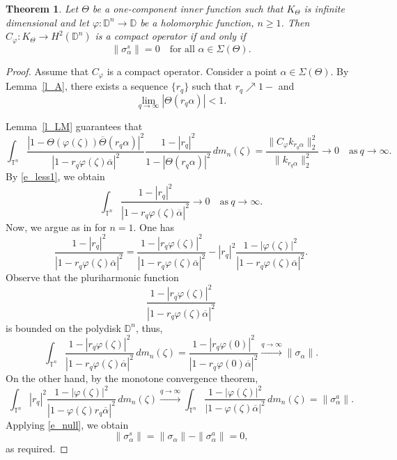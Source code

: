 \documentclass{amsart}
\numberwithin{equation}{section}
\newtheorem{theorem}{Theorem}[section]
\theoremstyle{definition}
\newcommand{\al}{\alpha}
\newcommand{\clk}{\sigma}
\newcommand{\meal}{m_n}
\newcommand{\diin}{\Theta}
\newcommand{\za}{\zeta}
\newcommand{\ph}{\varphi}
\newcommand{\cph}{C_\varphi}
\newcommand{\Dbb}{\mathbb D}
\newcommand{\tn}{\mathbb{T}^n}
\newcommand{\dn}{\mathbb{D}^n}
\newcommand{\knl}{k}
\newcommand{\spr}{\Sigma}
\begin{document}
\begin{theorem}\label{T_2}
Let $\diin$ be a one-component inner function such that $K_\diin$ is infinite dimensional
and let $\ph: \dn\to \Dbb$ be a holomorphic function, $n\ge 1$.
Then $\cph: K_\diin \to H^2(\dn)$ is a compact operator if and only if
\begin{equation}\label{e_clark}
\|\clk_\al^s\| =0 \quad \textrm{for all $\al\in\spr(\diin)$}.
\end{equation}
\end{theorem}
\begin{proof}
Assume that $\cph$ is a compact operator.
Consider a point $\al\in\spr(\diin)$.
By Lemma~\ref{l_A}, there exists a sequence $\{r_q\}$ such that $r_q\nearrow 1-$ and
\begin{equation}\label{e_less1}
  \lim_{q\to \infty} |\diin(r_q\al)| <1.
\end{equation}

Lemma~\ref{l_LM} guarantees that
\[
\int_{\tn}\frac{|1-\diin(\ph(\za))\overline{\diin}(r_q\al)|^2}{|1- r_q\ph(\za)\overline{\al}|^2} \frac{1-|r_q|^2}{1-|\diin(r_q\al)|^2}\,d\meal(\za)
= \frac{\|\cph \knl_{r_q\al}\|^2_{2}}{\|\knl_{r_q\al}\|^2_2} \to 0\quad \textrm{as}\ q\to\infty.
\]
By \eqref{e_less1}, we obtain
\begin{equation}\label{e_null}
  \int_{\tn}\frac{1-|r_q|^2}{|1- r_q\ph(\za)\overline{\al}|^2}
\to 0\quad \textrm{as}\ q\to\infty.
\end{equation}
Now, we argue as in \cite{CM97} for $n=1$.
One has
\[
\frac{1-|r_q|^2}{|1- r_q\ph(\za)\overline{\al}|^2}
= \frac{1-|r_q \ph(\za)|^2}{|1- r_q\ph(\za)\overline{\al}|^2}
-  |r_q|^2 \frac{1-|\ph(\za)|^2}{|1- r_q\ph(\za)\overline{\al}|^2}.
\]
Observe that the pluriharmonic function
\[
\frac{1-|r_q \ph(\za)|^2}{|1- r_q\ph(\za)\overline{\al}|^2}
\]
is bounded on the polydisk $\dn$,
thus,
\[
\int_{\tn}\frac{1-|r_q \ph(\za)|^2}{|1- r_q\ph(\za)\overline{\al}|^2}\, d\meal(\za) =
\frac{1-|r_q \ph(0)|^2}{|1- r_q\ph(0)\overline{\al}|^2}\overset{q\to \infty}\longrightarrow  \|\clk_\al\|.
\]
On the other hand, by the monotone convergence theorem,
\[
\int_{\tn}|r_q|^2 \frac{1-|\ph(\za)|^2}{|1- \ph(\za) r_q\overline{\al}|^2}\, d\meal(\za) \overset{q\to \infty}\longrightarrow
\int_{\tn}\frac{1-|\ph(\za)|^2}{|1- \ph(\za)\overline{\al}|^2}\, d\meal(\za) = \|\clk_\al^a\|.
\]
Applying \eqref{e_null}, we obtain
\[
\|\clk_\al^s\| = \|\clk_\al\| - \|\clk_\al^a\| =0,
\]
as required.


\end{proof}
\end{document}
